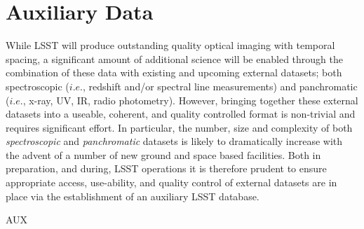 \section{Auxiliary Data}\label{sec:tasks:aux}  
{\justify
While LSST will produce outstanding quality optical imaging with temporal spacing, a significant amount of additional science will be enabled through the combination of these data with existing and upcoming external datasets; both spectroscopic ($i.e.$, redshift and/or spectral line measurements) and panchromatic ($i.e.$, x-ray, UV, IR, radio photometry). However, bringing together these external datasets into a useable, coherent, and quality controlled format is non-trivial and requires significant effort. In particular, the number, size and complexity of both {\it spectroscopic} and {\it panchromatic} datasets is likely to dramatically increase with the advent of a number of new ground and space based facilities. Both in preparation, and during, LSST operations it is therefore prudent to ensure appropriate access, use-ability, and quality control of external datasets are in place via the establishment of an auxiliary LSST database.



\begin{tasklist}{AUX}

\end{tasklist}}
